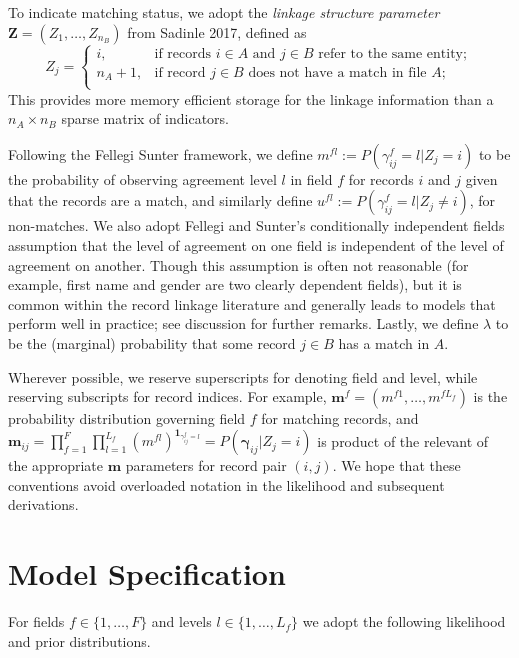 \documentclass[
  12pt,
]{article}
\begin{document}
To indicate matching status, we adopt the \emph{linkage structure
parameter} \(\mathbf{Z} = (Z_1, \ldots, Z_{n_B})\) from Sadinle 2017,
defined as \[Z_j=\begin{cases} 
    i,  & \text{if records } i\in A \text{ and } j\in B \text{ refer to the same entity}; \\
    n_A + 1,  & \text{if record } j\in B \text{ does not have a match in file } A; \\
\end{cases}\] This provides more memory efficient storage for the
linkage information than a \(n_A \times n_B\) sparse matrix of
indicators.

Following the Fellegi Sunter framework, we define
\(m^{fl}:= P(\gamma_{ij}^f = l |Z_j = i)\) to be the probability of
observing agreement level \(l\) in field \(f\) for records \(i\) and
\(j\) given that the records are a match, and similarly define
\(u^{fl}:= P(\gamma_{ij}^f = l |Z_j \neq i)\), for non-matches. We also
adopt Fellegi and Sunter's conditionally independent fields assumption
that the level of agreement on one field is independent of the level of
agreement on another. Though this assumption is often not reasonable
(for example, first name and gender are two clearly dependent fields),
but it is common within the record linkage literature and generally
leads to models that perform well in practice; see discussion for
further remarks. Lastly, we define \(\lambda\) to be the (marginal)
probability that some record \(j \in B\) has a match in \(A\).

Wherever possible, we reserve superscripts for denoting field and level,
while reserving subscripts for record indices. For example,
\(\mathbf{m}^f = (m^{f1}, \ldots, m^{fL_f})\) is the probability
distribution governing field \(f\) for matching records, and
\(\mathbf{m}_{ij}= \prod_{f=1}^{F}\prod_{l=1}^{L_f} \left(m^{fl}\right)^{\mathbf{1}_{\gamma_{ij}^f = l}} = P(\boldsymbol{\gamma}_{ij}|Z_j = i)\)
is product of the relevant of the appropriate \(\mathbf{m}\) parameters
for record pair \((i,j)\). We hope that these conventions avoid
overloaded notation in the likelihood and subsequent derivations.

\hypertarget{model-specification}{%
\section{Model Specification}\label{model-specification}}

For fields \(f \in \{1, \ldots, F\}\) and levels
\(l\in \{1, \ldots, L_f\}\) we adopt the following likelihood and prior
distributions.
\end{document}

